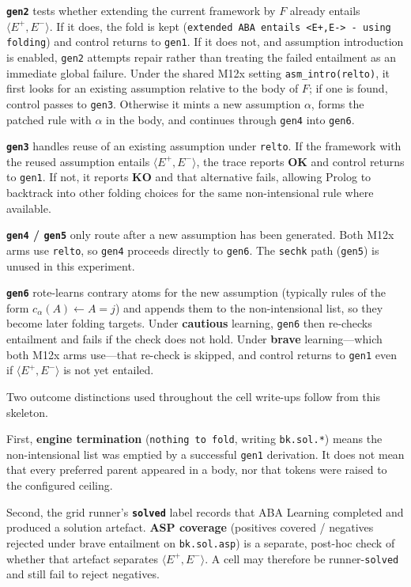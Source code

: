 \documentclass[11pt]{article}
\begin{document}
\textbf{\texttt{gen2}} tests whether extending the current framework by \(F\) already entails \(\langle E^+,E^-\rangle\). If it does, the fold is kept (\texttt{extended ABA entails <E+,E-> - using folding}) and control returns to \texttt{gen1}. If it does not, and assumption introduction is enabled, \texttt{gen2} attempts repair rather than treating the failed entailment as an immediate global failure. Under the shared M12x setting \texttt{asm\_intro(relto)}, it first looks for an existing assumption relative to the body of \(F\); if one is found, control passes to \texttt{gen3}. Otherwise it mints a new assumption \(\alpha\), forms the patched rule with \(\alpha\) in the body, and continues through \texttt{gen4} into \texttt{gen6}.

\textbf{\texttt{gen3}} handles reuse of an existing assumption under \texttt{relto}. If the framework with the reused assumption entails \(\langle E^+,E^-\rangle\), the trace reports \textbf{OK} and control returns to \texttt{gen1}. If not, it reports \textbf{KO} and that alternative fails, allowing Prolog to backtrack into other folding choices for the same non-intensional rule where available.

\textbf{\texttt{gen4} / \texttt{gen5}} only route after a new assumption has been generated. Both M12x arms use \texttt{relto}, so \texttt{gen4} proceeds directly to \texttt{gen6}. The \texttt{sechk} path (\texttt{gen5}) is unused in this experiment.

\textbf{\texttt{gen6}} rote-learns contrary atoms for the new assumption (typically rules of the form \(c_\alpha(A) \leftarrow A=j\)) and appends them to the non-intensional list, so they become later folding targets. Under \textbf{cautious} learning, \texttt{gen6} then re-checks entailment and fails if the check does not hold. Under \textbf{brave} learning---which both M12x arms use---that re-check is skipped, and control returns to \texttt{gen1} even if \(\langle E^+,E^-\rangle\) is not yet entailed.

Two outcome distinctions used throughout the cell write-ups follow from this skeleton.

First, \textbf{engine termination} (\texttt{nothing to fold}, writing \texttt{bk.sol.*}) means the non-intensional list was emptied by a successful \texttt{gen1} derivation. It does not mean that every preferred parent appeared in a body, nor that tokens were raised to the configured ceiling.

Second, the grid runner's \textbf{\texttt{solved}} label records that ABA Learning completed and produced a solution artefact. \textbf{ASP coverage} (positives covered / negatives rejected under brave entailment on \texttt{bk.sol.asp}) is a separate, post-hoc check of whether that artefact separates \(\langle E^+,E^-\rangle\). A cell may therefore be runner-\texttt{solved} and still fail to reject negatives.
\end{document}
